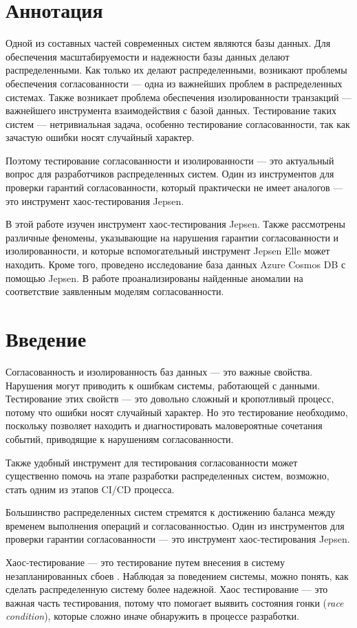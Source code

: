 \documentclass[14pt,  openany]{book}
\begin{document}
\chapter{Аннотация}
\par Одной из составных частей современных систем являются базы данных. Для обеспечения масштабируемости и надежности базы данных делают распределенными. Как только их делают распределенными, возникают проблемы обеспечения согласованности --- одна из важнейших проблем в распределенных системах. Также возникает проблема обеспечения изолированности транзакций --- важнейшего инструмента взаимодействия с базой данных. Тестирование таких систем --- нетривиальная задача, особенно тестирование согласованности, так как зачастую ошибки носят случайный характер.
\par Поэтому тестирование согласованности и изолированности --- это актуальный вопрос для разработчиков распределенных систем. Один из инструментов для проверки гарантий согласованности, который практически не имеет аналогов --- это инструмент хаос-тестирования Jepsen.
\par В этой работе изучен инструмент хаос-тестирования Jepsen. Также рассмотрены различные феномены, указывающие на нарушения гарантии согласованности и изолированности, и которые вспомогательный инструмент Jepsen Elle может находить. Кроме того, проведено исследование база данных Azure Cosmos DB с помощью Jepsen.  В работе проанализированы найденные аномалии на соответствие заявленным моделям согласованности.

\setcounter{page}{2}
\tableofcontents
\clearpage

\chapter{Введение}

Согласованность и изолированность баз данных --- это важные свойства. Нарушения могут приводить к ошибкам системы, работающей с данными.  Тестирование этих свойств --- это довольно сложный и кропотливый процесс, потому что ошибки носят случайный характер.  Но это тестирование необходимо, поскольку позволяет находить и диагностировать маловероятные сочетания событий, приводящие к нарушениям согласованности.
\par Также удобный инструмент для тестирования согласованности может существенно помочь на этапе разработки распределенных систем, возможно, стать одним из этапов CI/CD процесса.
\par Большинство распределенных систем стремятся к достижению баланса между временем выполнения операций и согласованностью.  Один из инструментов для проверки гарантии согласованности --- это инструмент хаос-тестирования Jepsen.  
\par Хаос-тестирование --- это тестирование путем внесения в систему незапланированных сбоев \cite{chaosTesting}.  Наблюдая за поведением системы, можно понять, как сделать распределенную систему более надежной. Хаос тестирование --- это важная часть тестирования, потому что помогает выявить состояния гонки (\textit{race condition}), которые сложно иначе обнаружить в процессе разработки.
\end{document}

